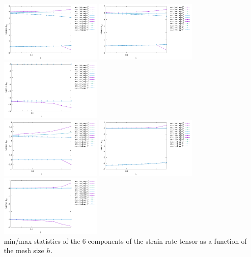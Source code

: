 \begin{center}
\includegraphics[width=5cm]{python_codes/fieldstone_75/results/burst/exx_stats.pdf}
\includegraphics[width=5cm]{python_codes/fieldstone_75/results/burst/eyy_stats.pdf}
\includegraphics[width=5cm]{python_codes/fieldstone_75/results/burst/ezz_stats.pdf}\\
\includegraphics[width=5cm]{python_codes/fieldstone_75/results/burst/exy_stats.pdf}
\includegraphics[width=5cm]{python_codes/fieldstone_75/results/burst/exz_stats.pdf}
\includegraphics[width=5cm]{python_codes/fieldstone_75/results/burst/eyz_stats.pdf}\\
{\captionfont min/max statistics of the 6 components of the strain rate tensor
as a function of the mesh size $h$.}
\end{center}


